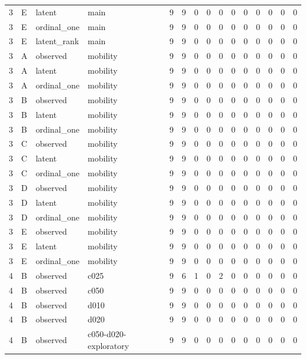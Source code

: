 \begin{tabular}{llllrrrrrrrrrrr}
3 & E & latent & main & 9 & 9 & 0 & 0 & 0 & 0 & 0 & 0 & 0 & 0 & 0 \\
3 & E & ordinal\_one & main & 9 & 9 & 0 & 0 & 0 & 0 & 0 & 0 & 0 & 0 & 0 \\
3 & E & latent\_rank & main & 9 & 9 & 0 & 0 & 0 & 0 & 0 & 0 & 0 & 0 & 0 \\
3 & A & observed & mobility & 9 & 9 & 0 & 0 & 0 & 0 & 0 & 0 & 0 & 0 & 0 \\
3 & A & latent & mobility & 9 & 9 & 0 & 0 & 0 & 0 & 0 & 0 & 0 & 0 & 0 \\
3 & A & ordinal\_one & mobility & 9 & 9 & 0 & 0 & 0 & 0 & 0 & 0 & 0 & 0 & 0 \\
3 & B & observed & mobility & 9 & 9 & 0 & 0 & 0 & 0 & 0 & 0 & 0 & 0 & 0 \\
3 & B & latent & mobility & 9 & 9 & 0 & 0 & 0 & 0 & 0 & 0 & 0 & 0 & 0 \\
3 & B & ordinal\_one & mobility & 9 & 9 & 0 & 0 & 0 & 0 & 0 & 0 & 0 & 0 & 0 \\
3 & C & observed & mobility & 9 & 9 & 0 & 0 & 0 & 0 & 0 & 0 & 0 & 0 & 0 \\
3 & C & latent & mobility & 9 & 9 & 0 & 0 & 0 & 0 & 0 & 0 & 0 & 0 & 0 \\
3 & C & ordinal\_one & mobility & 9 & 9 & 0 & 0 & 0 & 0 & 0 & 0 & 0 & 0 & 0 \\
3 & D & observed & mobility & 9 & 9 & 0 & 0 & 0 & 0 & 0 & 0 & 0 & 0 & 0 \\
3 & D & latent & mobility & 9 & 9 & 0 & 0 & 0 & 0 & 0 & 0 & 0 & 0 & 0 \\
3 & D & ordinal\_one & mobility & 9 & 9 & 0 & 0 & 0 & 0 & 0 & 0 & 0 & 0 & 0 \\
3 & E & observed & mobility & 9 & 9 & 0 & 0 & 0 & 0 & 0 & 0 & 0 & 0 & 0 \\
3 & E & latent & mobility & 9 & 9 & 0 & 0 & 0 & 0 & 0 & 0 & 0 & 0 & 0 \\
3 & E & ordinal\_one & mobility & 9 & 9 & 0 & 0 & 0 & 0 & 0 & 0 & 0 & 0 & 0 \\
4 & B & observed & c025 & 9 & 6 & 1 & 0 & 2 & 0 & 0 & 0 & 0 & 0 & 0 \\
4 & B & observed & c050 & 9 & 9 & 0 & 0 & 0 & 0 & 0 & 0 & 0 & 0 & 0 \\
4 & B & observed & d010 & 9 & 9 & 0 & 0 & 0 & 0 & 0 & 0 & 0 & 0 & 0 \\
4 & B & observed & d020 & 9 & 9 & 0 & 0 & 0 & 0 & 0 & 0 & 0 & 0 & 0 \\
4 & B & observed & c050-d020-exploratory & 9 & 9 & 0 & 0 & 0 & 0 & 0 & 0 & 0 & 0 & 0 \\

\end{tabular}
